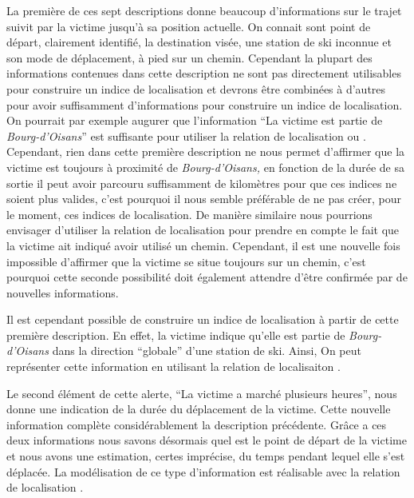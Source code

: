 La première de ces sept descriptions donne beaucoup d'informations sur
le trajet suivit par la victime jusqu'à sa position actuelle. On
connait sont point de départ, clairement identifié, la destination
visée, une station de ski inconnue et son mode de déplacement, à pied
sur un chemin. Cependant la plupart des informations contenues dans
cette description ne sont pas directement utilisables pour construire
un indice de localisation et devrons être combinées à d'autres pour
avoir suffisamment d'informations pour construire un indice de
localisation. On pourrait par exemple augurer que l'information
\enquote{La victime est partie de \emph{Bourg-d'Oisans}} est
suffisante pour utiliser la relation de localisation
 ou . Cependant,
rien dans cette première description ne nous permet d'affirmer que la
victime est toujours à proximité de \emph{Bourg-d'Oisans,} en fonction
de la durée de sa sortie il peut avoir parcouru suffisamment de
kilomètres pour que ces indices ne soient plus valides, c'est pourquoi
il nous semble préférable de ne pas créer, pour le moment, ces indices
de localisation. De manière similaire nous pourrions envisager
d'utiliser la relation de localisation
 pour
prendre en compte le fait que la victime ait indiqué avoir utilisé un
chemin. Cependant, il est une nouvelle fois impossible d'affirmer que
la victime se situe toujours sur un chemin, c'est pourquoi cette
seconde possibilité doit également attendre d'être confirmée par de
nouvelles informations.

Il est cependant possible de construire un indice de localisation à
partir de cette première description. En effet, la victime indique
qu'elle est partie de \emph{Bourg-d'Oisans} dans la direction
\enquote{globale} d'une station de ski. Ainsi, 
%
On peut représenter cette information en utilisant la relation de
localisaiton .



Le second élément de cette alerte, \enquote{La victime a marché
  plusieurs heures}, nous donne une indication de la durée du
déplacement de la victime. Cette nouvelle information complète
considérablement la description précédente.
%
Grâce a ces deux informations nous savons désormais quel est le point
de départ de la victime et nous avons une estimation, certes
imprécise, du temps pendant lequel elle s'est déplacée.
%
La modélisation de ce type d'information est réalisable avec la
relation de localisation .




